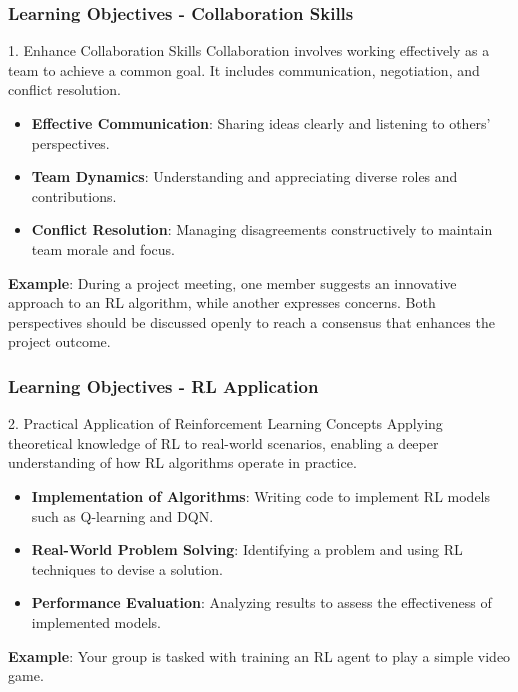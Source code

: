 \documentclass{beamer}
\begin{document}
\begin{frame}[fragile]
    \frametitle{Learning Objectives - Collaboration Skills}
    \begin{block}{1. Enhance Collaboration Skills}
        Collaboration involves working effectively as a team to achieve a common goal. It includes communication, negotiation, and conflict resolution.
    \end{block}
    \begin{itemize}
        \item \textbf{Effective Communication}: Sharing ideas clearly and listening to others’ perspectives.
        \item \textbf{Team Dynamics}: Understanding and appreciating diverse roles and contributions.
        \item \textbf{Conflict Resolution}: Managing disagreements constructively to maintain team morale and focus.
    \end{itemize}
    \textbf{Example}: During a project meeting, one member suggests an innovative approach to an RL algorithm, while another expresses concerns. Both perspectives should be discussed openly to reach a consensus that enhances the project outcome.
\end{frame}

\begin{frame}[fragile]
    \frametitle{Learning Objectives - RL Application}
    \begin{block}{2. Practical Application of Reinforcement Learning Concepts}
        Applying theoretical knowledge of RL to real-world scenarios, enabling a deeper understanding of how RL algorithms operate in practice.
    \end{block}
    \begin{itemize}
        \item \textbf{Implementation of Algorithms}: Writing code to implement RL models such as Q-learning and DQN.
        \item \textbf{Real-World Problem Solving}: Identifying a problem and using RL techniques to devise a solution.
        \item \textbf{Performance Evaluation}: Analyzing results to assess the effectiveness of implemented models.
    \end{itemize}
    \textbf{Example}: Your group is tasked with training an RL agent to play a simple video game.
\end{frame}
\end{document}
